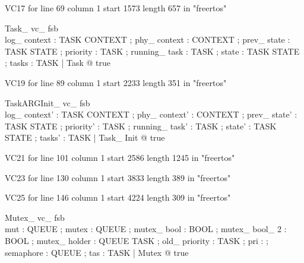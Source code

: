 \documentclass{article}
\begin{document}
VC17 for line 69 column 1 start 1573 length 657 in "freertos"
\begin{theorem}{ Task\_ vc\_ fsb}\\
 \exists log\_ context : TASK \fun CONTEXT ; phy\_ context : CONTEXT ; prev\_ state : TASK \fun STATE ; priority : TASK \fun \nat ; running\_ task : TASK ; state : TASK \fun STATE ; tasks : \power TASK | Task @ true \\

\end{theorem}

VC19 for line 89 column 1 start 2233 length 351 in "freertos"
\begin{theorem}{ TaskARGInit\_ vc\_ fsb}\\
 \exists log\_ context' : TASK \fun CONTEXT ; phy\_ context' : CONTEXT ; prev\_ state' : TASK \fun STATE ; priority' : TASK \fun \nat ; running\_ task' : TASK ; state' : TASK \fun STATE ; tasks' : \power TASK | Task\_ Init @ true \\

\end{theorem}

VC21 for line 101 column 1 start 2586 length 1245 in "freertos"

VC23 for line 130 column 1 start 3833 length 389 in "freertos"

VC25 for line 146 column 1 start 4224 length 309 in "freertos"
\begin{theorem}{ Mutex\_ vc\_ fsb}\\
 \exists mut : QUEUE ; mutex : \power QUEUE ; mutex\_ bool : BOOL ; mutex\_ bool\_ 2 : BOOL ; mutex\_ holder : QUEUE \pfun TASK ; old\_ priority : TASK \pfun \nat ; pri : \nat ; semaphore : \power QUEUE ; tas : TASK | Mutex @ true \\

\end{theorem}
\end{document}
